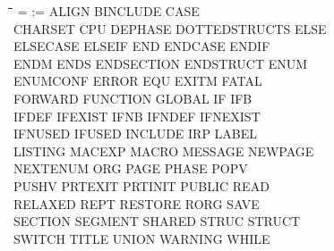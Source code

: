 {\tt\begin{tabbing}
\hspace{3cm}\=\hspace{3cm}\=\hspace{3cm}\=\hspace{3cm}\=\kill
=          \> :=          \> ALIGN       \> BINCLUDE    \> CASE \\
CHARSET    \> CPU         \> DEPHASE     \> DOTTEDSTRUCTS\> ELSE \\
ELSECASE   \> ELSEIF      \> END         \> ENDCASE     \> ENDIF \\
ENDM       \> ENDS        \> ENDSECTION  \> ENDSTRUCT   \> ENUM \\
ENUMCONF   \> ERROR       \> EQU         \> EXITM       \> FATAL \\
FORWARD    \> FUNCTION    \> GLOBAL      \> IF          \> IFB \\
IFDEF      \> IFEXIST     \> IFNB        \> IFNDEF      \> IFNEXIST \\
IFNUSED    \> IFUSED      \> INCLUDE     \> IRP         \> LABEL \\
LISTING    \> MACEXP      \> MACRO       \> MESSAGE     \> NEWPAGE \\
NEXTENUM   \> ORG         \> PAGE        \> PHASE       \> POPV \\
PUSHV      \> PRTEXIT     \> PRTINIT     \> PUBLIC      \> READ \\
RELAXED    \> REPT        \> RESTORE     \> RORG        \> SAVE \\
SECTION    \> SEGMENT     \> SHARED      \> STRUC       \> STRUCT \\
SWITCH     \> TITLE       \> UNION       \> WARNING     \> WHILE \\ 
\end{tabbing}}
